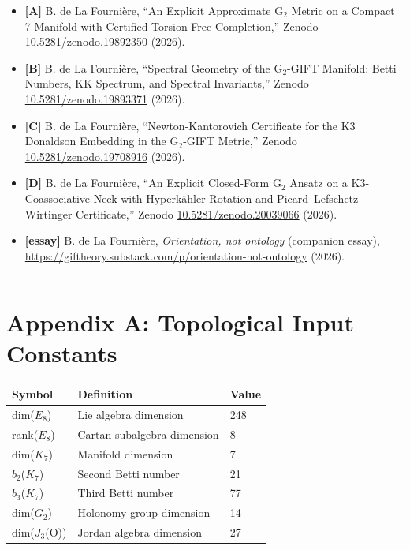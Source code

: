 \documentclass[11pt,a4paper]{article}
\begin{document}
\begin{itemize}
\item \textbf{[A]} B. de La Fourni\`ere, ``An Explicit Approximate $\mathrm{G}_2$ Metric on a Compact 7-Manifold with Certified Torsion-Free Completion,'' Zenodo \href{https://doi.org/10.5281/zenodo.19892350}{10.5281/zenodo.19892350} (2026).
\item \textbf{[B]} B. de La Fourni\`ere, ``Spectral Geometry of the $\mathrm{G}_2$-GIFT Manifold: Betti Numbers, KK Spectrum, and Spectral Invariants,'' Zenodo \href{https://doi.org/10.5281/zenodo.19893371}{10.5281/zenodo.19893371} (2026).
\item \textbf{[C]} B. de La Fourni\`ere, ``Newton-Kantorovich Certificate for the K3 Donaldson Embedding in the $\mathrm{G}_2$-GIFT Metric,'' Zenodo \href{https://doi.org/10.5281/zenodo.19708916}{10.5281/zenodo.19708916} (2026).
\item \textbf{[D]} B. de La Fourni\`ere, ``An Explicit Closed-Form $\mathrm{G}_2$ Ansatz on a K3-Coassociative Neck with Hyperk\"ahler Rotation and Picard--Lefschetz Wirtinger Certificate,'' Zenodo \href{https://doi.org/10.5281/zenodo.20039066}{10.5281/zenodo.20039066} (2026).
\item \textbf{[essay]} B. de La Fourni\`ere, \emph{Orientation, not ontology} (companion essay), \url{https://giftheory.substack.com/p/orientation-not-ontology} (2026).
\end{itemize}

\noindent

\rule{\textwidth}{0.2pt}

\section{Appendix A: Topological Input Constants}

\begin{longtable}[]{@{}lll@{}}
\toprule\noalign{}
Symbol & Definition & Value \\
\midrule\noalign{}
\endhead
\bottomrule\noalign{}
\endlastfoot
dim(\(E_{8}\)) & Lie algebra dimension & 248 \\
rank(\(E_{8}\)) & Cartan subalgebra dimension & 8 \\
dim(\(K_{7}\)) & Manifold dimension & 7 \\
\(b_{2}\)(\(K_{7}\)) & Second Betti number & 21 \\
\(b_{3}\)(\(K_{7}\)) & Third Betti number & 77 \\
dim(\(G_{2}\)) & Holonomy group dimension & 14 \\
dim(\(J_{3}\)(O)) & Jordan algebra dimension & 27 \\
\end{longtable}
\end{document}
